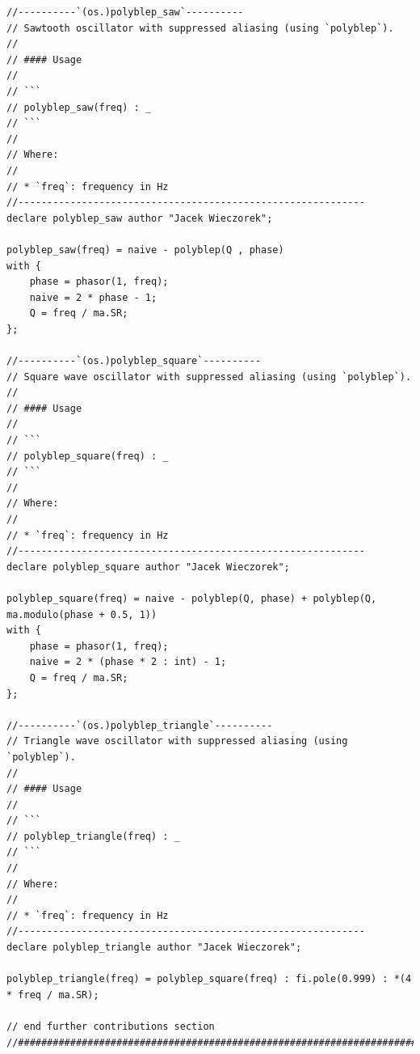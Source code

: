 \documentclass{article}
\begin{document}
\begin{lstlisting}[caption=\texttt{oscillators.lib}]
//----------`(os.)polyblep_saw`----------
// Sawtooth oscillator with suppressed aliasing (using `polyblep`).
//
// #### Usage
//
// ```
// polyblep_saw(freq) : _
// ```
//
// Where:
//
// * `freq`: frequency in Hz
//------------------------------------------------------------
declare polyblep_saw author "Jacek Wieczorek";

polyblep_saw(freq) = naive - polyblep(Q , phase)
with {
    phase = phasor(1, freq);
    naive = 2 * phase - 1;
    Q = freq / ma.SR;
};

//----------`(os.)polyblep_square`----------
// Square wave oscillator with suppressed aliasing (using `polyblep`).
//
// #### Usage
//
// ```
// polyblep_square(freq) : _
// ```
//
// Where:
//
// * `freq`: frequency in Hz
//------------------------------------------------------------
declare polyblep_square author "Jacek Wieczorek";

polyblep_square(freq) = naive - polyblep(Q, phase) + polyblep(Q, ma.modulo(phase + 0.5, 1))
with {
    phase = phasor(1, freq);
    naive = 2 * (phase * 2 : int) - 1;
    Q = freq / ma.SR;
};

//----------`(os.)polyblep_triangle`----------
// Triangle wave oscillator with suppressed aliasing (using `polyblep`).
//
// #### Usage
//
// ```
// polyblep_triangle(freq) : _
// ```
//
// Where:
//
// * `freq`: frequency in Hz
//------------------------------------------------------------
declare polyblep_triangle author "Jacek Wieczorek";

polyblep_triangle(freq) = polyblep_square(freq) : fi.pole(0.999) : *(4 * freq / ma.SR);

// end further contributions section
//########################################################################################
\end{lstlisting}
\end{document}
